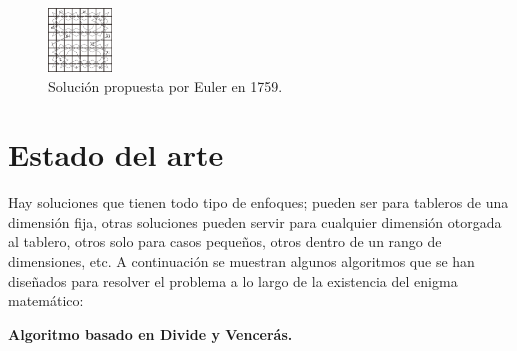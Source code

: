 \documentclass[journal, 10pt]{IEEEtran}
\begin{document}
\begin{figure}[h]

\centering
\includegraphics[width=0.15\textwidth]{figures/EulerKT.png}
\caption{Soluci\'on propuesta por Euler en 1759.}
\label{fig:euler}

\end{figure}
\section{Estado del arte}
Hay soluciones que tienen todo tipo de enfoques; pueden ser para tableros de una dimensión fija, otras soluciones pueden servir para cualquier dimensión otorgada al tablero, otros solo para casos pequeños, otros dentro de un rango de dimensiones, etc. A continuación se muestran algunos algoritmos que se han diseñados para resolver el problema a lo largo de la existencia del enigma matemático:

\textbf{Algoritmo basado en Divide y Vencer\'as.}
\end{document}

